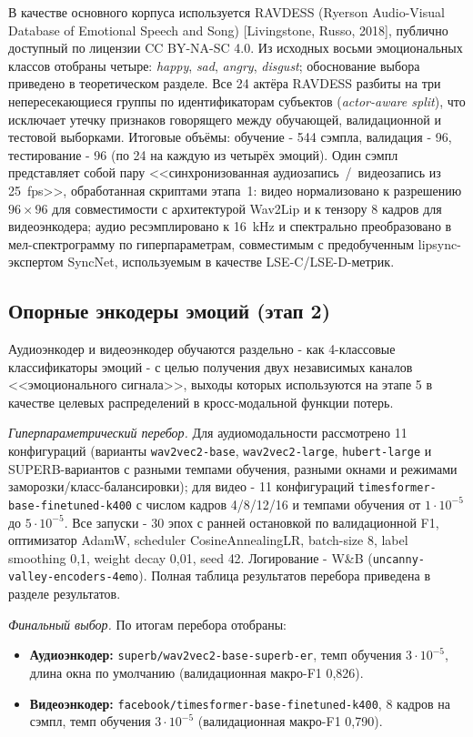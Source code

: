 \documentclass[a4paper, 12pt, oneside, openany]{article}
\begin{document}
В качестве основного корпуса используется RAVDESS (Ryerson Audio-Visual Database of Emotional Speech and Song) [Livingstone, Russo, 2018], публично доступный по лицензии CC BY-NA-SC 4.0. Из исходных восьми эмоциональных классов отобраны четыре: \textit{happy}, \textit{sad}, \textit{angry}, \textit{disgust}; обоснование выбора приведено в теоретическом разделе. Все 24 актёра RAVDESS разбиты на три непересекающиеся группы по идентификаторам субъектов (\textit{actor-aware split}), что исключает утечку признаков говорящего между обучающей, валидационной и тестовой выборками. Итоговые объёмы: обучение - 544 сэмпла, валидация - 96, тестирование - 96 (по 24 на каждую из четырёх эмоций). Один сэмпл представляет собой пару <<синхронизованная аудиозапись~/~видеозапись из 25~fps>>, обработанная скриптами этапа~1: видео нормализовано к разрешению $96\times 96$ для совместимости с архитектурой Wav2Lip и к тензору 8 кадров для видеоэнкодера; аудио ресэмплировано к 16~kHz и спектрально преобразовано в мел-спектрограмму по гиперпараметрам, совместимым с предобученным lipsync-экспертом SyncNet, используемым в качестве LSE-C/LSE-D-метрик.

\subsection{Опорные энкодеры эмоций (этап 2)}

Аудиоэнкодер и видеоэнкодер обучаются раздельно - как 4-классовые классификаторы эмоций - с целью получения двух независимых каналов <<эмоционального сигнала>>, выходы которых используются на этапе 5 в качестве целевых распределений в кросс-модальной функции потерь.

\textit{Гиперпараметрический перебор.} Для аудиомодальности рассмотрено 11 конфигураций (варианты \texttt{wav2vec2-base}, \texttt{wav2vec2-large}, \texttt{hubert-large} и SUPERB-вариантов с разными темпами обучения, разными окнами и режимами заморозки/класс-балансировки); для видео - 11 конфигураций \texttt{timesformer-base-finetuned-k400} с числом кадров 4/8/12/16 и темпами обучения от $1\!\cdot\!10^{-5}$ до $5\!\cdot\!10^{-5}$. Все запуски - 30 эпох с ранней остановкой по валидационной F1, оптимизатор AdamW, scheduler CosineAnnealingLR, batch-size 8, label smoothing 0,1, weight decay 0,01, seed 42. Логирование - W\&B (\texttt{uncanny-valley-encoders-4emo}). Полная таблица результатов перебора приведена в разделе результатов.

\textit{Финальный выбор.} По итогам перебора отобраны:
\begin{itemize}
\item \textbf{Аудиоэнкодер:} \texttt{superb/wav2vec2-base-superb-er}, темп обучения $3\!\cdot\!10^{-5}$, длина окна по умолчанию (валидационная макро-F1 0,826).
\item \textbf{Видеоэнкодер:} \texttt{facebook/timesformer-base-finetuned-k400}, 8 кадров на сэмпл, темп обучения $3\!\cdot\!10^{-5}$ (валидационная макро-F1 0,790).
\end{itemize}
\end{document}
